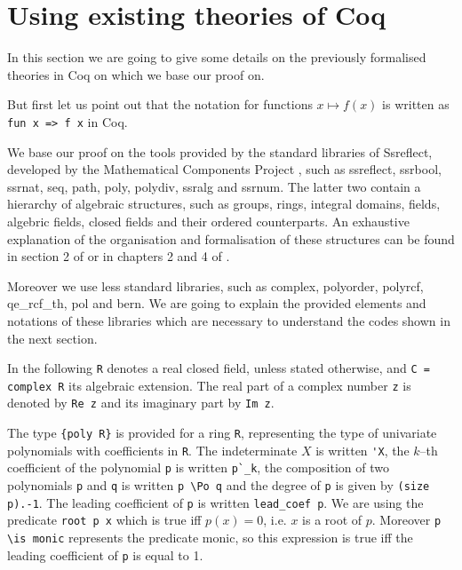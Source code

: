 \documentclass[11pt, a4paper]{article}
\begin{document}
\section{Using existing theories of Coq}

In this section we are going to give some details on the previously formalised theories in Coq on which we base our proof on.

But first let us point out that the notation for functions $x \mapsto f(x)$ is written as \lstinline!fun x => f x! in Coq.

We base our proof on the tools provided by the standard libraries of Ssreflect, developed by the Mathematical Components Project \cite{ssreflect}, such as \textsf{ssreflect}, \textsf{ssrbool}, \textsf{ssrnat}, \textsf{seq}, \textsf{path}, \textsf{poly}, \textsf{polydiv}, \textsf{ssralg} and \textsf{ssrnum}. The latter two contain a hierarchy of algebraic structures, such as groups, rings, integral domains, fields, algebric fields, closed fields and their ordered counterparts. An exhaustive explanation of the organisation and formalisation of these structures can be found in section 2 of \cite{cm_ssr} or in chapters 2 and 4 of \cite{cohen_phd}.

Moreover we use less standard libraries, such as \textsf{complex}, \textsf{polyorder}, \textsf{polyrcf}, \textsf{qe\_rcf\_th}, \textsf{pol} and \textsf{bern}. We are going to explain the provided elements and notations of these libraries which are necessary to understand the codes shown in the next section.

In the following \lstinline{R} denotes a real closed field, unless stated otherwise, and \lstinline!C = complex R!  its algebraic extension. The real part of a complex number \lstinline?z? is denoted by \lstinline!Re z! and its imaginary part by \lstinline!Im z!.%

The type \lstinline!{poly R}! is provided for a ring \lstinline!R!, representing the type of univariate polynomials with coefficients in \lstinline!R!.  The indeterminate $X$ is written \lstinline!'X!, the $k$--th coefficient of the polynomial \lstinline!p! is written \lstinline!p`_k!, the composition of two polynomials \lstinline!p! and \lstinline!q! is written \lstinline!p \Po q! and the degree of \lstinline!p! is given by \lstinline!(size p).-1!. The leading coefficient of \lstinline!p! is written \lstinline!lead_coef p!. We are using the predicate \lstinline!root p x! which is true iff $p(x) = 0$, i.e. $x$ is a root of $p$. Moreover \lstinline!p \is monic! represents the predicate monic, so this expression is true iff the leading coefficient of \lstinline!p! is equal to 1.
\end{document}
